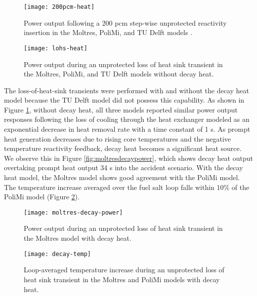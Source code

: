 \begin{figure}[htb!]
    \centering
    \begin{minipage}[b]{.49\textwidth}
      \centering
      \texttt{[image: 200pcm-heat]}
      \caption{Power output following a 200 pcm step-wise unprotected reactivity
        insertion in the Moltres, PoliMi, and
        TU Delft models \cite{fiorina_modelling_2014}.}
      \label{fig:200pcmheat}
    \end{minipage}
    \hfill
    \begin{minipage}[b]{.49\textwidth}
      \centering
      \texttt{[image: lohs-heat]}
      \caption{Power output during
        an unprotected loss of heat sink transient in the Moltres, PoliMi, and
        TU Delft models \cite{fiorina_modelling_2014} without decay heat.}
      \label{fig:lohsheat}
    \end{minipage}
\end{figure}

The loss-of-heat-sink transients were performed with and without the decay heat
model because the TU Delft model did not possess this capability. As shown in
Figure \ref{fig:lohsheat}, without decay heat, all three models reported
similar power output responses following the loss of cooling through the heat
exchanger modeled as an exponential decrease in heat removal rate with a time
constant of 1 s. As prompt heat generation decreases due to rising core
temperatures and the negative temperature reactivity feedback, decay heat
becomes a significant heat source. We observe this in Figure
\ref{fig:moltresdecaypower}, which shows decay heat output overtaking prompt
heat output 34 s into the accident scenario. With the decay heat model, the
Moltres model shows good agreement with the PoliMi model. The temperature
increase averaged over the fuel salt loop falls within 10\% of the PoliMi
model (Figure \ref{fig:polimidecaytemp}).

\begin{figure}[htb!]
	\centering
	\begin{minipage}[t]{0.485\columnwidth}
	    \texttt{[image: moltres-decay-power]}
	    \caption{Power output during
    an unprotected loss of heat sink transient in the Moltres model with
    decay heat.}
	    \label{fig:moltresdecaypower}
	\end{minipage}
	\hfill
	\begin{minipage}[t]{0.485\columnwidth}
	    \texttt{[image: decay-temp]}
	    \caption{Loop-averaged temperature increase during
    an unprotected loss of heat sink transient in the Moltres and PoliMi
    models \cite{fiorina_modelling_2014} with decay heat.}
	    \label{fig:polimidecaytemp}
	\end{minipage}
\end{figure}


